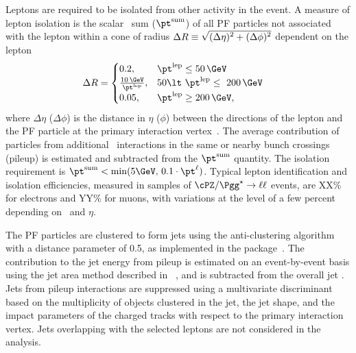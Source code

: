 Leptons are required to be isolated from other activity in the event. A measure of lepton isolation is the scalar \pt\ sum
 ($\pt^\text{sum}$) of all PF particles not associated with the lepton within a cone of radius 
$\Delta R \equiv\sqrt{\smash[b]{(\Delta\eta)^2+(\Delta\phi)^2}}$ dependent on the lepton \pt\:
\begin{align}
\centering
  \Delta R &=\begin{cases}
    0.2, & \pt^{\text{lep}}\leq 50\,\GeV\\
    \frac{10\,\GeV}{\pt^{\text{lep}}}, & 50 \lt\ \pt^{\text{lep}} \le\ 200\,\GeV\\
    0.05, & \pt^{\text{lep}}\geq 200\,\GeV,
  \end{cases}\label{eq:miniIso}
\end{align}
where $\Delta \eta$ ($\Delta \phi$) is the distance in $\eta$ ($\phi$) between the directions of the lepton and the PF particle at 
the primary interaction vertex~\cite{TRK-11-001}. The average contribution of particles from additional \Pp\Pp\ interactions in the 
same or nearby bunch crossings (pileup) is estimated and subtracted from the $\pt^\text{sum}$ quantity. The isolation requirement is
$\pt^\text{sum} <  \min(5\GeV,\, 0.1 \cdot \pt^{\ell})$. Typical lepton identification and isolation efficiencies, measured in
samples of $\ensuremath{\cPZ/\Pgg^\star} \to \ell \ell$ events, are XX\% for electrons and YY\% for muons, with variations at the level of 
a few percent depending on \pt\ and $\eta$.

The PF particles are clustered to form jets using the anti-\kt clustering algorithm~\cite{antikt} with a distance parameter of 0.5, as 
implemented in the {\FASTJET} package~\cite{Cacciari:2011ma}. The contribution to the jet energy from pileup is estimated on an 
event-by-event basis using the jet area method described in ~\cite{cacciari-2008-659}, and is subtracted from the overall jet \pt.
Jets from pileup interactions are suppressed using a multivariate discriminant based on the multiplicity of objects clustered in the jet,
the jet shape, and the impact parameters of the charged tracks with respect to the primary interaction vertex. Jets overlapping with 
the selected leptons are not considered in the analysis.

